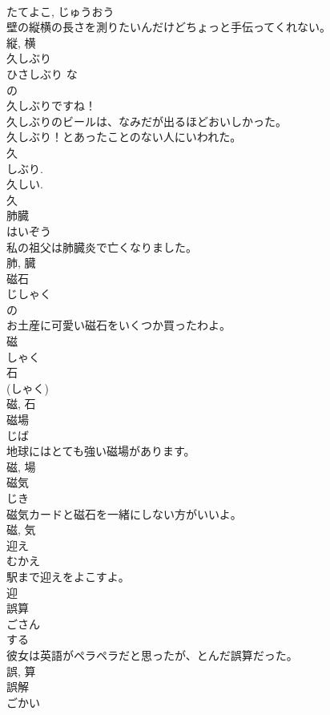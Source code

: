 \documentclass[8pt]{extreport}
\begin{document}
\begin{CJK}{UTF8}{min}
\\	たてよこ, じゅうおう	
\\	壁の縦横の長さを測りたいんだけどちょっと手伝ってくれない。	
\\	縦, 横	
\\	久しぶり	
\\	ひさしぶり	な 
\\	の 
\\	久しぶりですね！	
\\	久しぶりのビールは、なみだが出るほどおいしかった。	
\\	久しぶり！とあったことのない人にいわれた。	
\\	久 
\\	しぶり. 
\\	久しい. 
\\	久	
\\	肺臓	
\\	はいぞう	
\\	私の祖父は肺臓炎で亡くなりました。	
\\	肺, 臓	
\\	磁石	
\\	じしゃく	
\\	の 
\\	お土産に可愛い磁石をいくつか買ったわよ。	
\\	磁 
\\	しゃく 
\\	石 
\\	(しゃく) 
\\	磁, 石	
\\	磁場	
\\	じば	
\\	地球にはとても強い磁場があります。	
\\	磁, 場	
\\	磁気	
\\	じき	
\\	磁気カードと磁石を一緒にしない方がいいよ。	
\\	磁, 気	
\\	迎え	
\\	むかえ	
\\	駅まで迎えをよこすよ。	
\\	迎	
\\	誤算	
\\	ごさん	
\\	する 
\\	彼女は英語がペラペラだと思ったが、とんだ誤算だった。	
\\	誤, 算	
\\	誤解	
\\	ごかい	

\end{CJK}
\end{document}

